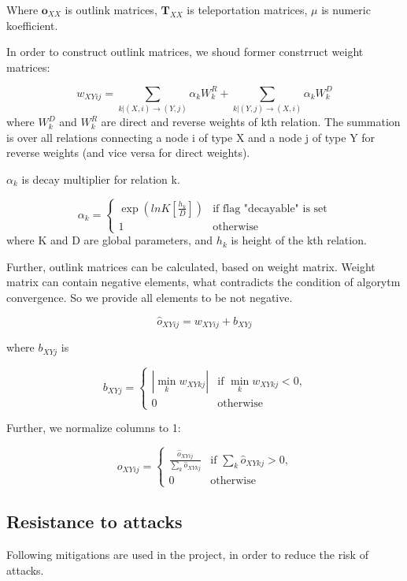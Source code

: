 \documentclass[a4paper,12pt]{article}
\begin{document}
Where $\boldsymbol{o}_{XX}$ is outlink matrices, $\boldsymbol{T}_{XX}$ is teleportation matrices, $\mu$ is numeric koefficient.

In order to construct outlink matrices, we shoud former constrruct weight matrices:

$$
    w_{XYij} = \sum_{k|(X,i) \to (Y,j)} \alpha_k W^R_k + \sum_{k|(Y,j) \to (X,i)} \alpha_k W^D_k
$$
where $W^D_k$ and $W^R_k$ are direct and reverse weights of kth relation. The summation is over all relations connecting a node i of type X and a node j of type Y for reverse weights (and vice versa for direct weights).

$\alpha_k$ is decay multiplier for relation k. 

$$
\alpha_k = \begin{cases}
 \exp{(lnK [\frac{h_k}{D}])}
 & \text{if flag "decayable" is set}\\
 1 & \text{otherwise}
\end{cases} 
$$
where K and D are global parameters, and $h_k$ is height of the kth relation.

Further, outlink matrices can be calculated, based on weight matrix. Weight matrix can contain negative elements, what contradicts the condition of algorytm convergence. So we provide all elements to be not negative.

$$
\hat{o}_{XYij} = w_{XYij} + b_{XYj}
$$

where $b_{XYj}$ is

$$
b_{XYj} = \begin{cases}
 |\min_k w_{XYkj}|
 & \text {if $\min_k w_{XYkj} < 0$,}\\
 0 & \text{otherwise}
\end{cases} 
$$

Further, we normalize columns to 1:

$$
o_{XYij} = \begin{cases}
 \frac{\hat{o}_{XYij}} {\sum\limits_{k} \hat{o}_{XYkj}}
 & \text{if $\sum\limits_{k} \hat{o}_{XYkj}> 0$,}\\
 0 & \text{otherwise}
\end{cases} 
$$

\subsection{Resistance to attacks}

Following mitigations are used in the project, in order to reduce the risk of attacks.
\end{document}
